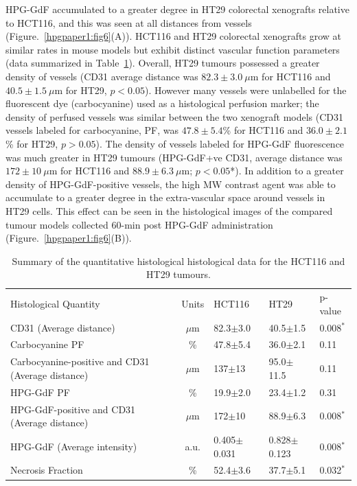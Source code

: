 HPG-GdF accumulated to a greater degree in HT29 colorectal xenografts relative to HCT116, and this was seen at all distances from vessels (Figure.~\ref{hpgpaper1:fig6}(A)).
HCT116 and HT29 colorectal xenografts grow at similar rates in mouse models but exhibit distinct vascular function parameters (data summarized in Table~\ref{hpgpaper:table1}).
Overall, HT29 tumours possessed a greater density of vessels (\acs{CD31} average distance was $82.3\pm 3.0~\mu$m for HCT116 and $40.5\pm 1.5~\mu$m for HT29, $p<0.05$).
However many vessels were unlabelled for the fluorescent dye (carbocyanine) used as a histological perfusion marker; the density of perfused vessels was similar between the two xenograft models (\acs{CD31} vessels labeled for carbocyanine, PF, was $47.8\pm 5.4$\% for HCT116 and $36.0\pm 2.1$\% for HT29, $p>0.05$).
The density of vessels labeled for \acs{HPG-GdF} fluorescence was much greater in HT29 tumours (HPG-GdF+ve \acs{CD31}, average distance was $172\pm 10~\mu$m for HCT116 and $88.9\pm 6.3~\mu$m; $p < 0.05$*).
In addition to a greater density of \acs{HPG-GdF}-positive vessels, the high \acs{MW} contrast agent was able to accumulate to a greater degree in the extra-vascular space around vessels in HT29 cells.
This effect can be seen in the histological images of the compared tumour models collected 60-min post \acs{HPG-GdF} administration (Figure.~\ref{hpgpaper1:fig6}(B)).

\begin{table}[htbp]
\begin{center}
    \begin{tabular}{@{}p{3.2cm}clll@{}}
    \rowcolor{gray!50}
Histological Quantity & Units & HCT116 & HT29 & p-value  \\
CD31 \newline(Average distance) & $\mu$m & 82.3$\pm$3.0    & 40.5$\pm$1.5    & 0.008$^{*}$ \\
Carbocyanine \acs{PF} & \%                        & 47.8$\pm$5.4    & 36.0$\pm$2.1    & 0.11    \\
Carbocyanine-positive and CD31 (Average distance)                           & $\mu$m               & 137$\pm$13      & 95.0$\pm$11.5   & 0.11    \\
\acs{HPG-GdF} \acs{PF}                        & \%                        & 19.9$\pm$2.0    & 23.4$\pm$1.2    & 0.31    \\
\acs{HPG-GdF}-positive and CD31  (Average distance) & $\mu$m               & 172$\pm$10      & 88.9$\pm$6.3    & 0.008$^{*}$ \\
\acs{HPG-GdF} (Average intensity) & a.u. & 0.405$\pm$0.031 & 0.828$\pm$0.123 & 0.008$^{*}$ \\
Necrosis Fraction                                        & \%                       & 52.4$\pm$3.6    & 37.7$\pm$5.1    & 0.032$^*$ 
\end{tabular}
\caption{Summary of the quantitative histological histological data for the HCT116 and HT29 tumours.}
\label{hpgpaper:table1}
\end{center}
\end{table}

